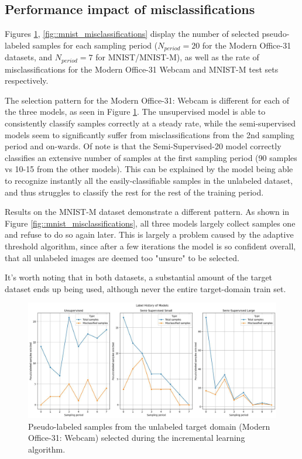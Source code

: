 \documentclass[12pt, a4paper]{article}
\begin{document}
	
	\subsection{Performance impact of misclassifications}
	
	
	Figures \ref{fig::office_misclassifications}, \ref{fig::mnist_misclassifications} display the number of selected pseudo-labeled samples for each sampling period ($N_{period}=20$ for the Modern Office-31 datasets, and $N_{period}=7$ for MNIST/MNIST-M), as well as the rate of misclassifications for the Modern Office-31 Webcam and MNIST-M test sets respectively. 
	
	The selection pattern for the Modern Office-31: Webcam is different for each of the three models, as seen in Figure \ref{fig::office_misclassifications}. The unsupervised model is able to consistently classify samples correctly at a steady rate, while the semi-supervised models seem to significantly suffer from misclassifications from the 2nd sampling period and on-wards. Of note is that the Semi-Supervised-20 model correctly classifies an extensive number of samples at the first sampling period (90 samples vs 10-15 from the other models). This can be explained by the model being able to recognize instantly all the easily-classifiable samples in the unlabeled dataset, and thus struggles to classify the rest for the rest of the training period. 
	
	Results on the MNIST-M dataset demonstrate a different pattern. As shown in Figure \ref{fig::mnist_misclassifications}, all three models largely collect samples one and refuse to do so again later. This is largely a problem caused by the adaptive threshold algorithm, since after a few iterations the model is so confident overall, that all unlabeled images are deemed too "unsure" to be selected.
	
	It's worth noting that in both datasets, a substantial amount of the target dataset ends up being used, although never the entire target-domain train set.

	
	\begin{figure}
		\centering
		\includegraphics[width=12cm]{"office_misclassifications.jpeg"}
		\caption{Pseudo-labeled samples from the unlabeled target domain (Modern Office-31: Webcam) selected during the incremental learning algorithm.}
		\label{fig::office_misclassifications}
	\end{figure}
\end{document}
